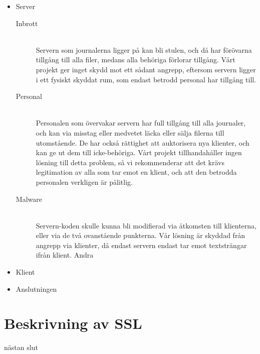\documentclass[titlepage,a4paper]{article}
\begin{document}
\begin{itemize}
\item Server
	\begin{description}
	\item [Inbrott] \hfill \\
Servern som journalerna ligger på kan bli stulen, och då har förövarna tillgång till alla filer, medans alla behöriga förlorar tillgång. Vårt projekt ger inget skydd mot ett sådant angrepp, eftersom servern ligger i ett fysiskt skyddat rum, som endast betrodd personal har tillgång till.
	\item [Personal] \hfill \\
Personalen som övervakar servern har full tillgång till alla journaler, och kan via misstag eller medvetet läcka eller sälja filerna till utomstående. De har också rättighet att auktorisera nya klienter, och kan ge ut dem till icke-behöriga. Vårt projekt tillhandahåller ingen lösning till  detta problem, så vi rekommenderar att det krävs legitimation av alla som tar emot en klient, och att den betrodda personalen verkligen är pålitlig.

\item [Malware] \hfill \\
Servern-koden skulle kunna bli modifierad via åtkomsten till klienterna, eller via de två ovanstående punkterna. Vår lösning är skyddad från angrepp via klienter, då endast servern endast tar emot textsträngar ifrån klient. Andra 

	\end{description}
\item Klient

\item Anslutningen
\end{itemize}



\section{Beskrivning av SSL}
nästan slut
\end{document}
